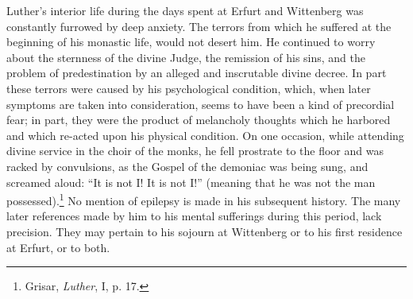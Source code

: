 Luther’s interior life during the days spent at Erfurt and Wittenberg
was constantly furrowed by deep anxiety. The terrors from
which he suffered at the beginning of his monastic life, would not
desert him. He continued to worry about the sternness of the divine
Judge, the remission of his sins, and the problem of predestination
by an alleged and inscrutable divine decree. In part these terrors
were caused by his psychological condition, which, when later symptoms
are taken into consideration, seems to have been a kind of precordial
fear; in part, they were the product of melancholy thoughts
which he harbored and which re-acted upon his physical condition.
On one occasion, while attending divine service in the choir of the
monks, he fell prostrate to the floor and was racked by convulsions,
as the Gospel of the demoniac was being sung, and screamed aloud:
“It is not I! It is not I!” (meaning that he was not the man possessed).\footnote{Grisar, \textit{Luther}, I, p. 17.}
No mention of epilepsy is made in his subsequent history.
The many later references made by him to his mental sufferings during
this period, lack precision. They may pertain to his sojourn at
Wittenberg or to his first residence at Erfurt, or to both.

